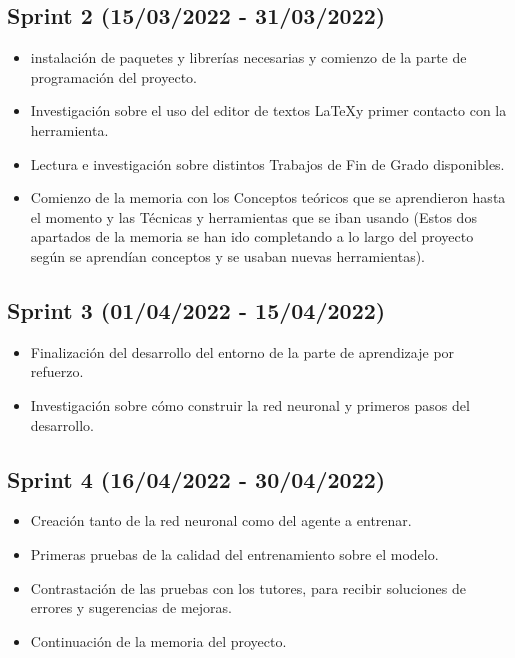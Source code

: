 
\subsection{Sprint 2 (15/03/2022 - 31/03/2022)}
\begin{itemize}
    \item instalación de paquetes y librerías necesarias y comienzo de la parte de programación del proyecto.
    \item Investigación sobre el uso del editor de textos \LaTeX y primer contacto con la herramienta.
    \item Lectura e investigación sobre distintos Trabajos de Fin de Grado disponibles.
    \item Comienzo de la memoria con los Conceptos teóricos que se aprendieron hasta el momento y las Técnicas y herramientas que se iban usando (Estos dos apartados de la memoria se han ido completando a lo largo del proyecto según se aprendían conceptos y se usaban nuevas herramientas).
\end{itemize}


\subsection{Sprint 3 (01/04/2022 - 15/04/2022)}
\begin{itemize}
    \item Finalización del desarrollo del entorno de la parte de aprendizaje por refuerzo.
    \item Investigación sobre cómo construir la red neuronal y primeros pasos del desarrollo.
\end{itemize}


\subsection{Sprint 4 (16/04/2022 - 30/04/2022)}
\begin{itemize}
    \item Creación tanto de la red neuronal como del agente a entrenar.
    \item Primeras pruebas de la calidad del entrenamiento sobre el modelo.
    \item Contrastación de las pruebas con los tutores, para recibir soluciones de errores y sugerencias de mejoras.
    \item Continuación de la memoria del proyecto.
\end{itemize}

